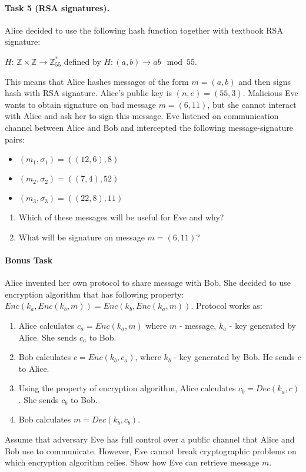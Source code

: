 \documentclass{article}
\begin{document}
\paragraph{Task 5 (RSA signatures).} Alice decided to use the following hash function together with textbook RSA signature:
\begin{center}
    $H$: $\mathbb{Z} \times \mathbb{Z} \rightarrow \mathbb{Z}^*_{55}$ defined by $H: (a,b) \rightarrow ab \mod{55}$.
\end{center}
This means that Alice hashes messages of the form $m = (a,b)$ and then signs hash with RSA signature. Alice's public key is $(n,e) = (55,3)$. Malicious Eve wants to obtain signature on bad message $m = (6,11)$, but she cannot interact with Alice and ask her to sign this message. Eve listened on communication channel between Alice and Bob and intercepted the following message-signature pairs:
\begin{itemize}
    \item $(m_1, \sigma_1) = ((12,6), 8)$
    \item $(m_2, \sigma_2) = ((7,4), 52)$
    \item $(m_3, \sigma_3) = ((22,8), 11)$
\end{itemize}

\begin{enumerate}
    \item Which of these messages will be useful for Eve and why? 
    \item What will be signature on message $m = (6,11)$?
\end{enumerate}


\paragraph{Bonus Task} 
Alice invented her own protocol to share message with Bob. She decided to use encryption algorithm that has following property: $Enc(k_a, Enc(k_b, m)) = Enc(k_b, Enc(k_a, m))$. Protocol works as:
\begin{enumerate}
    \item Alice calculates $c_a = Enc(k_a, m)$ where $m$ - message, $k_a$ - key generated by Alice. She sends $c_a$ to Bob. 
    \item Bob calculates $c=Enc(k_b, c_a)$, where $k_b$ - key generated by Bob. He sends $c$ to Alice.
    \item Using the property of encryption algorithm, Alice calculates $c_b=Dec(k_a, c)$. She sends $c_b$ to Bob.
    \item Bob calculates $m=Dec(k_b, c_b)$.
\end{enumerate}

Assume that adversary Eve has full control over a public channel that Alice and Bob use to communicate. However, Eve cannot break cryptographic problems on which encryption algorithm relies. Show how Eve can retrieve message $m$. 
\end{document}
